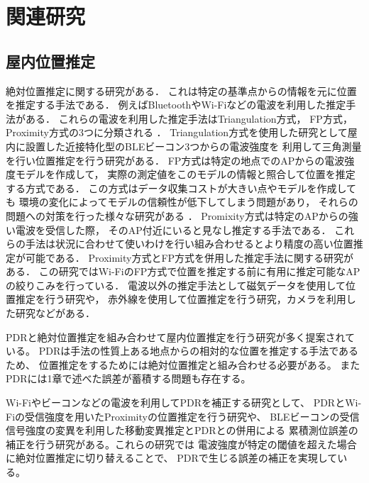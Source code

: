 


\chapter{関連研究}


\section{屋内位置推定}

絶対位置推定に関する研究がある．
これは特定の基準点からの情報を元に位置を推定する手法である．
例えばBluetoothやWi-Fiなどの電波を利用した推定手法がある．
これらの電波を利用した推定手法はTriangulation方式，
FP方式，Proximity方式の3つに分類される
\cite{wireless-lan-summary}．
Triangulation方式を使用した研究として屋内に設置した近接特化型のBLEビーコン3つからの電波強度を
利用して三角測量を行い位置推定を行う研究がある\cite{ble-indoor}\cite{ble-tandem}\cite{triangulation-kalman}．
FP方式は特定の地点でのAPからの電波強度モデルを作成して，
実際の測定値をこのモデルの情報と照合して位置を推定する方式である．
この方式はデータ収集コストが大きい点やモデルを作成しても
環境の変化によってモデルの信頼性が低下してしまう問題があり，
それらの問題への対策を行った様々な研究がある
\cite{gaussian-mixture-model}
\cite{wireless-lan-cost-reduction}
\cite{fingerprint-auto-update}
\cite{wi-fi-fingerprint-domain}．
Promixity方式は特定のAPからの強い電波を受信した際，
そのAP付近にいると見なし推定する手法である．
これらの手法は状況に合わせて使いわけを行い組み合わせるとより精度の高い位置推定が可能である．
Proximity方式とFP方式を併用した推定手法に関する研究がある\cite{proximity-fingerprint}．
この研究ではWi-FiのFP方式で位置を推定する前に有用に推定可能なAPの絞りこみを行っている．
電波以外の推定手法として磁気データを使用して位置推定を行う研究\cite{pdr-mag}や，
赤外線を使用して位置推定を行う研究\cite{infrared}，カメラを利用した研究\cite{camera}などがある．


PDRと絶対位置推定を組み合わせて屋内位置推定を行う研究が多く提案されている。
PDRは手法の性質上ある地点からの相対的な位置を推定する手法であるため、
位置推定をするためには絶対位置推定と組み合わせる必要がある。
またPDRには1章で述べた誤差が蓄積する問題も存在する。

Wi-Fiやビーコンなどの電波を利用してPDRを補正する研究として、
PDRとWi-Fiの受信強度を用いたProximityの位置推定を行う研究\cite{pdr-wifi}や、
BLEビーコンの受信信号強度の変異を利用した移動変異推定とPDRとの併用による
累積測位誤差の補正を行う研究\cite{pdr-ble}がある。これらの研究では
電波強度が特定の閾値を超えた場合に絶対位置推定に切り替えることで、
PDRで生じる誤差の補正を実現している。

